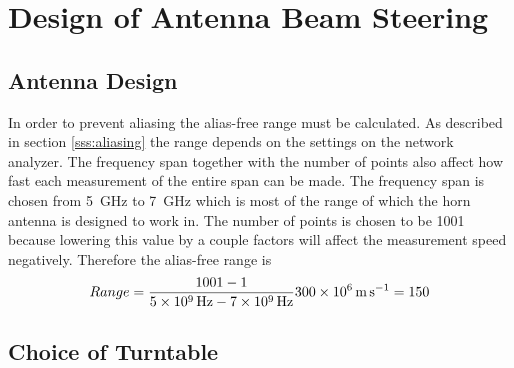 \chapter{Design of Antenna Beam Steering} 

\section{Antenna Design}

In order to prevent aliasing the alias-free range must be calculated. As described in section \ref{sss:aliasing} the range depends on the settings on the network analyzer. The frequency span together with the number of points also affect how fast each measurement of the entire span can be made. 
The frequency span is chosen from \SI{5}{\giga\hertz} to \SI{7}{\giga\hertz} which is most of the range of which the horn antenna is designed to work in. The number of points is chosen to be \SI{1001}{} because lowering this value by a couple factors will affect the measurement speed negatively. Therefore the alias-free range is
\begin{equation}
    Range = \frac{1001-1}{\SI{5E9}{\hertz}-\SI{7E9}{\hertz}} \SI{300E6}{\meter\per\second} = 150
    \tagaddtext{[\si{\meter}]}
\end{equation}

\section{Choice of Turntable}

